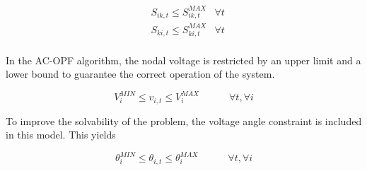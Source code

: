 \begin{subequations}
\begin{align*}
&  S_{ik,t} \leq S_{ik,t}^{MAX}  &\forall t  \\
&  S_{ki,t} \leq S_{ki,t}^{MAX}  &\forall t  \\ 
\end{align*}
\end{subequations}

In the AC-OPF algorithm, the nodal voltage is restricted by an upper limit and a lower bound to guarantee the correct operation of the system. 

\begin{equation*}
V_{i}^{MIN} \leq v_{i,t} \leq V_{i}^{MAX}  \quad   \qquad  \forall t, \forall i 
\end{equation*}

To improve the solvability of the problem, the voltage angle constraint is included in this model. This yields
%

\begin{equation*}
 \theta_{i}^{MIN} \leq \theta_{i,t}  \leq \theta_{i}^{MAX} \quad   \qquad  \forall t, \forall i  
\end{equation*}


